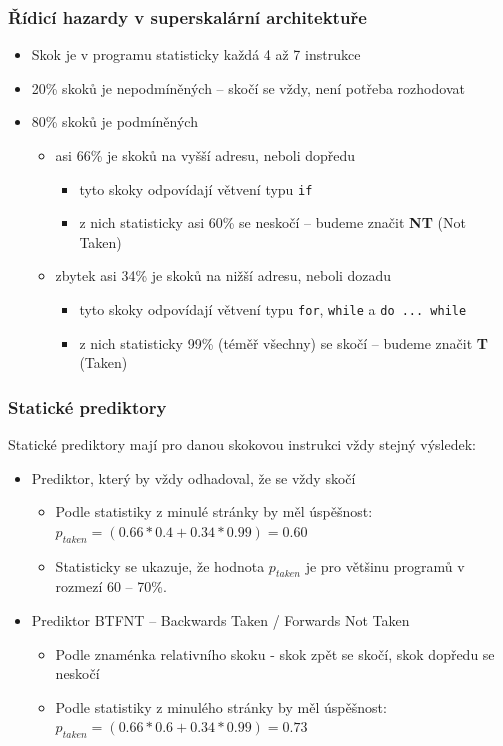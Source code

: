 \documentclass{beamer}
\begin{document}
\begin{frame}
\frametitle{Řídicí hazardy v superskalární architektuře}

\begin{itemize}
\item Skok je v programu statisticky každá 4 až 7 instrukce
\item 20\% skoků je nepodmíněných -- skočí se vždy, není potřeba rozhodovat
\item 80\% skoků je podmíněných
  \begin{itemize}
  \item asi 66\% je skoků na vyšší adresu, neboli dopředu 
    \begin{itemize}
    \item tyto skoky odpovídají větvení typu \texttt{if} 
    \item z nich statisticky asi 60\% se neskočí -- budeme značit \textbf{NT} (Not Taken)
    \end{itemize}
  \item zbytek asi 34\% je skoků na nižší adresu, neboli dozadu 
    \begin{itemize}
    \item tyto skoky odpovídají větvení typu \texttt{for}, \texttt{while} a \texttt{do ... while}
    \item z nich statisticky 99\% (téměř všechny) se skočí -- budeme značit \textbf{T} (Taken)
    \end{itemize}
  \end{itemize}
\end{itemize}

\end{frame}


\begin{frame}
\frametitle{Statické prediktory}

Statické prediktory mají pro danou skokovou instrukci vždy stejný výsledek:
\begin{itemize}
\item Prediktor, který by vždy odhadoval, že se vždy skočí 
\begin{itemize}
\item Podle statistiky z minulé stránky by měl úspěšnost: $p_{taken} = (0.66*0.4+0.34*0.99) = 0.60$
\item Statisticky se ukazuje, že hodnota $p_{taken}$ je pro většinu programů v rozmezí 60 -- 70\%.
\end{itemize}
\item Prediktor BTFNT -- Backwards Taken / Forwards Not Taken  
\begin{itemize}
\item Podle znaménka relativního skoku - skok zpět se skočí, skok dopředu se neskočí
\item Podle statistiky z minulého stránky by měl úspěšnost: $p_{taken} = (0.66*0.6+0.34*0.99) = 0.73$
\end{itemize}
\end{itemize}

\end{frame}
\end{document}
